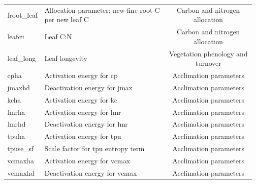 \documentclass[draft]{agujournal2019}
\begin{document}
\begin{landscape}
\begin{table}[h]
\begin{tabular}{l l c}
froot\_leaf & Allocation parameter: new fine root C per new leaf C & Carbon and nitrogen allocation \\
leafcn & Leaf C:N & Carbon and nitrogen allocation \\
leaf\_long & Leaf longevity & Vegetation phenology and turnover \\
cpha & Activation energy for cp & Acclimation parameters \\
jmaxhd & Deactivation energy for jmax & Acclimation parameters \\
kcha & Activation energy for kc & Acclimation parameters \\
lmrha & Activation energy for lmr & Acclimation parameters \\
lmrhd & Deactivation energy for lmr & Acclimation parameters \\
tpuha & Activation energy for tpu & Acclimation parameters \\
tpuse\_sf & Scale factor for tpu entropy term & Acclimation parameters \\
vcmaxha & Activation energy for vcmax & Acclimation parameters \\
vcmaxhd & Deactivation energy for vcmax & Acclimation parameters \\
 \hline
 \end{tabular}
 \end{table}
\end{landscape}
\end{document}

